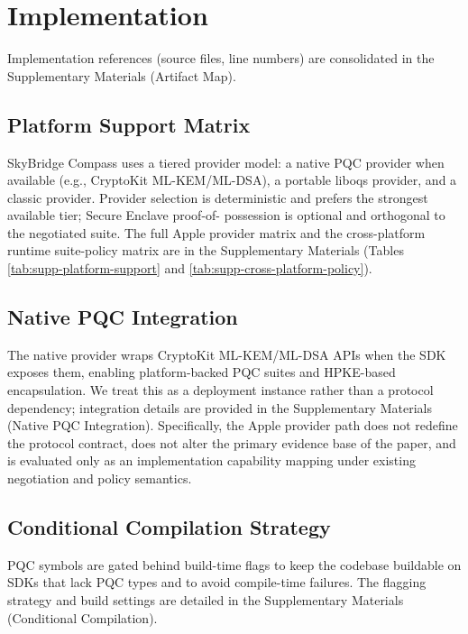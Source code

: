 \documentclass[10pt,journal,compsoc]{IEEEtran}
\begin{document}
\section{Implementation}\label{sec:implementation}

Implementation references (source files, line numbers) are consolidated in the Supplementary Materials (Artifact Map).

\subsection{Platform Support
Matrix}\label{a.-platform-support-matrix}

SkyBridge Compass uses a tiered provider model: a native PQC provider
when available (e.g., CryptoKit ML-KEM/ML-DSA), a portable liboqs
provider, and a classic provider. Provider selection is deterministic
and prefers the strongest available tier; Secure Enclave proof-of-
possession is optional and orthogonal to the negotiated suite. The full
Apple provider matrix and the cross-platform runtime suite-policy matrix
are in the Supplementary Materials (Tables
\ref{tab:supp-platform-support} and \ref{tab:supp-cross-platform-policy}).

\subsection{Native PQC Integration}\label{b.-apple-pqc-integration}

The native provider wraps CryptoKit ML-KEM/ML-DSA APIs \cite{ref1,ref34} when the
SDK exposes them, enabling platform-backed PQC suites and HPKE-based
encapsulation. We treat this as a deployment instance rather than a
protocol dependency; integration details are provided in the
Supplementary Materials (Native PQC Integration). Specifically, the
Apple provider path does not redefine the protocol contract, does not
alter the primary evidence base of the paper, and is evaluated only as
an implementation capability mapping under existing negotiation and
policy semantics.

\subsection{Conditional Compilation
Strategy}\label{c.-conditional-compilation-strategy}

PQC symbols are gated behind build-time flags to keep the codebase
buildable on SDKs that lack PQC types and to avoid compile-time
failures. The flagging strategy and build settings are detailed in the
Supplementary Materials (Conditional Compilation).
\end{document}
